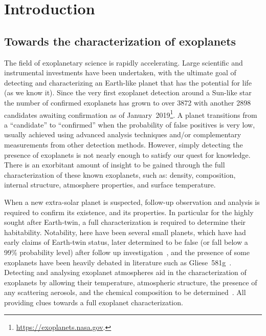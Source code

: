 
\chapter{Introduction}\label{cha:introduction}

\section{Towards the characterization of exoplanets}

The field of exoplanetary science is rapidly accelerating.
Large scientific and instrumental investments have been undertaken, with the ultimate goal of detecting and characterizing an Earth-like planet that has the potential for life (as we know it).
Since the very first exoplanet detection around a Sun-like star~\citep{mayor_jupitermass_1995} the number of confirmed exoplanets has grown to over 3872 with another 2898 candidates awaiting confirmation as of January~2019\footnote{\href{https://exoplanets.nasa.gov/}{\url{https://exoplanets.nasa.gov}}.}.
A planet transitions from a ``candidate'' to ``confirmed'' when the probability of false positives is very low, usually achieved using advanced analysis techniques and/or complementary measurements from other detection methods.
However, simply detecting the presence of exoplanets is not nearly enough to satisfy our quest for knowledge.
There is an exorbitant amount of insight to be gained through the full characterization of these known exoplanets, such as: density, composition, internal structure, atmosphere properties, and surface temperature.

When a new extra-solar planet is suspected, follow-up observation and analysis is required to confirm its existence, and its properties.
In particular for the highly sought after Earth-twin, a full characterization is required to determine their habitability.
Notability, here have been several small planets, which have had early claims of Earth-twin status, later determined to be false (or fall below a 99\% probability level) after follow up investigation~\citep[e.g.][]{mullally_kepler_2018,burke_reevaluating_2019}, and the presence of some exoplanets have been heavily debated in literature such as {Gliese~581g}~\citep{vogt_lickcarnegie_2010, gregory_bayesian_2011,robertson_stellar_2014}.
Detecting and analysing exoplanet atmospheres aid in the characterization of exoplanets by allowing their temperature, atmospheric structure, the presence of any scattering aerosols, and the chemical composition to be determined~\citep[e.g.][and references therein]{kreidberg_exoplanet_2018}.
All providing clues towards a full exoplanet characterization.

